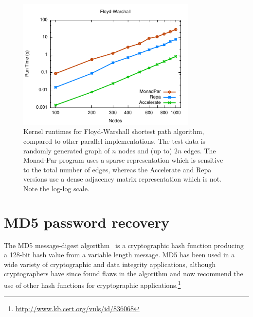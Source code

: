 \begin{figure}
    \centering
    \includegraphics[width=0.8\textwidth]{images/results/floyd-warshall/floyd-warshall}
    \caption[Floyd-Warshall shortest path benchmark]{Kernel runtimes for
    Floyd-Warshall shortest path algorithm, compared to other parallel
    implementations. The test data is randomly generated graph of $n$ nodes and
    (up to) $2n$ edges. The Monad-Par program uses a sparse representation which
    is sensitive to the total number of edges, whereas the Accelerate and Repa
    versions use a dense adjacency matrix representation which is not. Note the
    log-log scale.}
    \label{fig:floyd_warshall}
\end{figure}


\section{MD5 password recovery}

The MD5 message-digest algorithm~\cite{Rivest:1992va} is a cryptographic hash
function producing a 128-bit hash value from a variable length message. MD5 has
been used in a wide variety of cryptographic and data integrity applications,
although cryptographers have since found flaws in the algorithm and now
recommend the use of other hash functions for cryptographic
applications.\footnote{\url{http://www.kb.cert.org/vuls/id/836068}}

